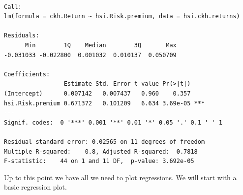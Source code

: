 \begin{Shaded}
\begin{Highlighting}[]
\StringTok{ }\StringTok{ }
\StringTok{ }
\StringTok{  }
\StringTok{ }
\StringTok{ }
\StringTok{ }
\StringTok{ }
\StringTok{ }

\StringTok{ }\StringTok{ } 
\end{Highlighting}
\end{Shaded}

\begin{verbatim}

Call:
lm(formula = ckh.Return ~ hsi.Risk.premium, data = hsi.ckh.returns)

Residuals:
      Min        1Q    Median        3Q       Max 
-0.031033 -0.022800  0.001032  0.010137  0.050709 

Coefficients:
                 Estimate Std. Error t value Pr(>|t|)    
(Intercept)      0.007142   0.007437   0.960    0.357    
hsi.Risk.premium 0.671372   0.101209   6.634 3.69e-05 ***
---
Signif. codes:  0 '***' 0.001 '**' 0.01 '*' 0.05 '.' 0.1 ' ' 1

Residual standard error: 0.02565 on 11 degrees of freedom
Multiple R-squared:    0.8, Adjusted R-squared:  0.7818 
F-statistic:    44 on 1 and 11 DF,  p-value: 3.692e-05
\end{verbatim}

Up to this point we have all we need to plot regressions. We will start
with a basic regression plot.

\begin{Shaded}
\begin{Highlighting}[]
\StringTok{ }\NormalTok{(}
\StringTok{  }\NormalTok{(}\NormalTok{) +}\StringTok{ }\NormalTok{(}
\end{Highlighting}
\end{Shaded}

